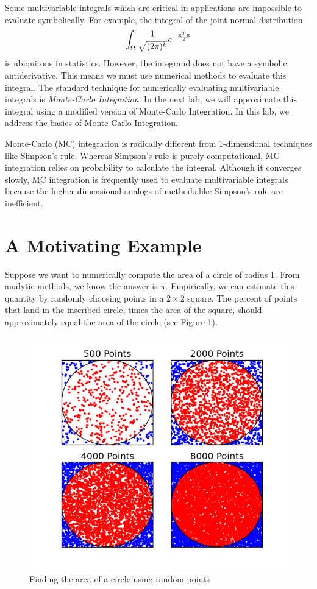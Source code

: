 
Some multivariable integrals which are critical in applications are impossible to evaluate symbolically.
For example, the integral of the joint normal distribution
\[
\int_{\Omega} \frac{1}{\sqrt{(2 \pi)^k}} e^{- \frac{\bold{x}^T\bold{x}}{2}}
\]
is ubiquitous in statistics.
However, the integrand does not have a symbolic antiderivative.
This means we must use numerical methods to evaluate this integral. The standard technique for numerically evaluating multivariable integrals is \emph{Monte-Carlo Integration}. In the next lab, we will approximate this integral using a modified version of Monte-Carlo Integration. In this lab, we address the basics of Monte-Carlo Integration.

Monte-Carlo (MC) integration is radically different from 1-dimensional techniques like Simpson's rule. Whereas Simpson's rule is purely computational, MC integration relies on probability to calculate the integral.
Although it converges slowly, MC integration is frequently used to evaluate multivariable integrals because the higher-dimensional analogs of methods like Simpson's rule are inefficient. 

\section*{A Motivating Example}
Suppose we want to numerically compute the area of a circle of radius 1.
From analytic methods, we know the answer is $\pi$.
Empirically, we can estimate this quantity by randomly choosing points in a $2 \times 2$ square.
The percent of points that land in the inscribed circle, times the area of the square, should approximately equal the area of the circle (see Figure \ref{fig:MCCircle}).

\begin{figure}
\includegraphics[width=.7\textwidth]{MC.png}
\caption{Finding the area of a circle using random points}
\label{fig:MCCircle}
\end{figure}

